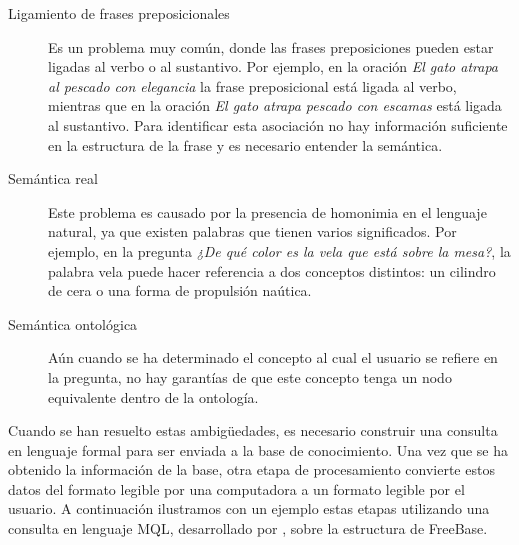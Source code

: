 \begin{description}
    \item[Ligamiento de frases preposicionales] Es un problema muy común, donde las frases preposiciones pueden estar ligadas al verbo o al sustantivo. Por ejemplo, en la oración \textit{El gato atrapa al pescado con elegancia} la frase preposicional está ligada al verbo, mientras que en la oración \textit{El gato atrapa pescado con escamas} está ligada al sustantivo. Para identificar esta asociación no hay información suficiente en la estructura de la frase y es necesario entender la semántica.
    \item[Semántica real] Este problema es causado por la presencia de homonimia en el lenguaje natural, ya que existen palabras que tienen varios significados. Por ejemplo, en la pregunta \textit{¿De qué color es la vela que está sobre la mesa?}, la palabra vela puede hacer referencia a dos conceptos distintos: un cilindro de cera o una forma de propulsión naútica.
    \item[Semántica ontológica] Aún cuando se ha determinado el concepto al cual el usuario se refiere en la pregunta, no hay garantías de que este concepto tenga un nodo equivalente dentro de la ontología.
\end{description}

Cuando se han resuelto estas ambigüedades, es necesario construir una consulta en lenguaje formal para ser enviada a la base de conocimiento. Una vez que se ha obtenido la información de la base, otra etapa de procesamiento convierte estos datos del formato legible por una computadora a un formato legible por el usuario. A continuación ilustramos con un ejemplo estas etapas utilizando una consulta en lenguaje MQL, desarrollado por \citet{mql}, sobre la estructura de FreeBase.

